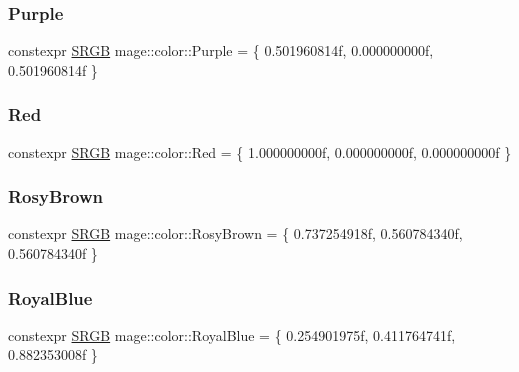 \hypertarget{namespacemage_1_1color_abc4e5ab035f468c7235a23b28f49f3d2}{}\label{namespacemage_1_1color_abc4e5ab035f468c7235a23b28f49f3d2} 
\subsubsection{\texorpdfstring{Purple}{Purple}}
{\footnotesize\ttfamily constexpr \hyperlink{structmage_1_1_s_r_g_b}{S\+R\+GB} mage\+::color\+::\+Purple = \{ 0.\+501960814f, 0.\+000000000f, 0.\+501960814f \}}

\hypertarget{namespacemage_1_1color_acd7c4f3812280375313aae5e97a7d21d}{}\label{namespacemage_1_1color_acd7c4f3812280375313aae5e97a7d21d} 
\subsubsection{\texorpdfstring{Red}{Red}}
{\footnotesize\ttfamily constexpr \hyperlink{structmage_1_1_s_r_g_b}{S\+R\+GB} mage\+::color\+::\+Red = \{ 1.\+000000000f, 0.\+000000000f, 0.\+000000000f \}}

\hypertarget{namespacemage_1_1color_a65da8e36be323fb9eb38de492925352b}{}\label{namespacemage_1_1color_a65da8e36be323fb9eb38de492925352b} 
\subsubsection{\texorpdfstring{Rosy\+Brown}{RosyBrown}}
{\footnotesize\ttfamily constexpr \hyperlink{structmage_1_1_s_r_g_b}{S\+R\+GB} mage\+::color\+::\+Rosy\+Brown = \{ 0.\+737254918f, 0.\+560784340f, 0.\+560784340f \}}

\hypertarget{namespacemage_1_1color_a01213c51a9d103e84356bb05902863a4}{}\label{namespacemage_1_1color_a01213c51a9d103e84356bb05902863a4} 
\subsubsection{\texorpdfstring{Royal\+Blue}{RoyalBlue}}
{\footnotesize\ttfamily constexpr \hyperlink{structmage_1_1_s_r_g_b}{S\+R\+GB} mage\+::color\+::\+Royal\+Blue = \{ 0.\+254901975f, 0.\+411764741f, 0.\+882353008f \}}


